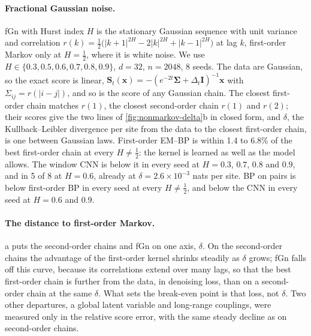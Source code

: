\documentclass{article}
\begin{document}
\paragraph{Fractional Gaussian noise.} fGn with Hurst index $H$ is the stationary Gaussian sequence with unit variance
and correlation $r(k)=\frac12\big(|k+1|^{2H}-2|k|^{2H}+|k-1|^{2H}\big)$ at lag $k$, first-order Markov only at
$H=\frac12$, where it is white noise. We use $H\in\{0.3,0.5,0.6,0.7,0.8,0.9\}$, $d=32$, $n=2048$, 8 seeds. The data are
Gaussian, so the exact score is linear, $\mathbf S_t(\mathbf x)=-(e^{-2t}\boldsymbol\Sigma+\Delta_t\mathbf I)^{-1}
\mathbf x$ with $\Sigma_{ij}=r(|i-j|)$, and so is the score of any Gaussian chain. The closest first-order chain matches
$r(1)$, the closest second-order chain $r(1)$ and $r(2)$; their scores give the two lines of
\cref{fig:nonmarkov-delta}b in closed form, and $\delta$, the Kullback--Leibler divergence per site from the data to the
closest first-order chain, is one between Gaussian laws. First-order EM--BP is within 1.4 to 6.8\% of the best
first-order chain at every $H\neq\frac12$: the kernel is learned as well as the model allows. The window CNN is below it
in every seed at $H=0.3$, $0.7$, $0.8$ and $0.9$, and in 5 of 8 at $H=0.6$, already at $\delta=2.6\times10^{-3}$ nats per
site. BP on pairs is below first-order BP in every seed at every $H\neq\frac12$, and below the CNN in every seed at
$H=0.6$ and $0.9$.

\paragraph{The distance to first-order Markov.} a puts the second-order chains and fGn on one
axis, $\delta$. On the second-order chains the advantage of the first-order kernel shrinks steadily as $\delta$ grows;
fGn falls off this curve, because its correlations extend over many lags, so that the best first-order chain is further
from the data, in denoising loss, than on a second-order chain at the same $\delta$. What sets the break-even point is
that loss, not $\delta$. Two other departures, a global latent variable and long-range couplings, were measured only in
the relative score error, with the same steady decline as on second-order chains.
\end{document}
